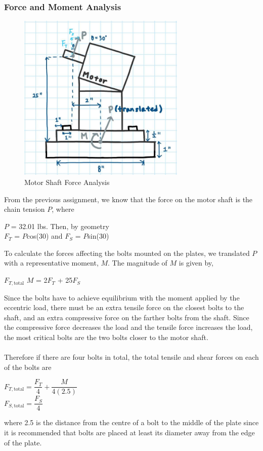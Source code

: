 \documentclass[letterpaper,12pt]{article}
\begin{document}
\subsubsection{Force and Moment Analysis}
\begin{figure}[h]
    \centering
    \includegraphics[width=8cm]{BoltForces.jpg}
    \caption{Motor Shaft Force Analysis}
\end{figure}
\noindent From the previous assignment, we know that the force on the motor shaft is the chain tension $P$, where
\begin{center}
    $P$ = 32.01 lbs. Then, by geometry\\
    $F_{T}$ = $P$cos(30) and $F_{S}$ = $P$sin(30)
\end{center}
To calculate the forces affecting the bolts mounted on the plates, we translated $P$ with a representative moment, $M$.
The magnitude of $M$ is given by,
\begin{center}
 $F_{T, \text{total}}$ 
    $M$ = 2$F_{T}$ + 25$F_{S}$
\end{center}

\noindent Since the bolts have to achieve equilibrium with the moment applied by the eccentric load, there must be an extra tensile force on the closest bolts to the shaft, and an extra compressive force on the farther bolts from the shaft. Since the compressive force decreases the load and the tensile force increases the load, the most critical bolts are the two bolts closer to the motor shaft.\\\\
\noindent Therefore if there are four bolts in total, the total tensile and shear forces on each of the bolts are
\begin{center}
   $F_{T,\text{total}} = \dfrac{F_{T}}{4} + \dfrac{M}{4(2.5)}$\\
   $F_{S,\text{total}} = \dfrac{F_{S}}{4}$
\end{center}
where 2.5 is the distance from the centre of a bolt to the middle of the plate since it is recommended that bolts are placed at least its diameter away from the edge of the plate. 
\end{document}
